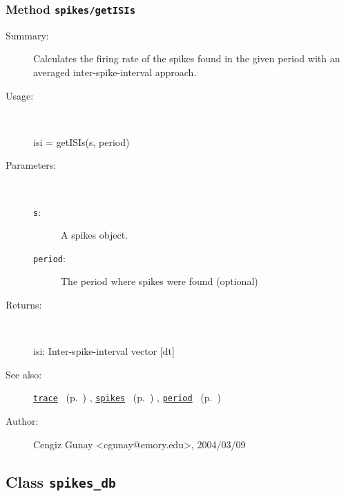 \subsubsection[Method \texttt{getISIs}]{Method \texttt{spikes/getISIs}}%
%
\label{ref_spikes__getISIs}%
\hypertarget{ref_spikes__getISIs}{}%
\begin{description}
\item[Summary:]Calculates the firing rate of the spikes found in the given 
		period with an averaged inter-spike-interval approach.
%
\item[Usage:]~%
\begin{lyxcode}%
isi = getISIs(s, period)
%
\end{lyxcode}%
%
%
\item[Parameters:]~
\begin{description}%
\item[\texttt{s}:]
 A spikes object.
\item[\texttt{period}:]
 The period where spikes were found (optional)
\end{description}%
%
\item[Returns:]~

	isi: Inter-spike-interval vector [dt]
%
%
\item[See also:]%
\hyperlink{ref_trace}{\texttt{trace}}%
\ (p.~\pageref{ref_trace})%
%
, \hyperlink{ref_spikes}{\texttt{spikes}}%
\ (p.~\pageref{ref_spikes})%
%
, \hyperlink{ref_period}{\texttt{period}}%
\ (p.~\pageref{ref_period})%
%
%
\item[Author:]%
Cengiz Gunay <cgunay@emory.edu>, 2004/03/09%
\end{description}
\methodline%
\subsection{Class \texttt{spikes\_db}}%
%
\label{ref_spikes_db}%
\hypertarget{ref_spikes_db}{}%
